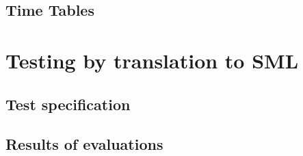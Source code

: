 \documentclass[a4]{article}
\begin{document}


\subsection{Time Tables}



\section{Testing by translation to SML}

\subsection{Test specification}

\subsection{Results of evaluations}
\end{document}
